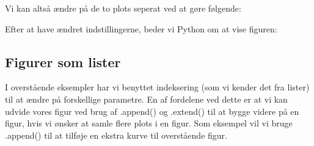 \documentclass[letterpaper,10pt,english]{jupyterBook}
\begin{document}
Vi kan altså ændre på de to plots seperat ved at gøre følgende:

\begin{sphinxVerbatim}[commandchars=\\\{\}]
\PYG{p}{[}\PYG{p}{]}    
\end{sphinxVerbatim}

\begin{sphinxVerbatim}[commandchars=\\\{\}]
\PYG{p}{[}\PYG{p}{]}      
\PYG{p}{[}\PYG{p}{]}       
\end{sphinxVerbatim}

Efter at have ændret indstillingerne, beder vi Python om at vise figuren:

\begin{sphinxVerbatim}[commandchars=\\\{\}]
\end{sphinxVerbatim}

\noindent{}


\subsection{Figurer som lister}
\label{\detokenize{notebooks/sympy/Notebook3_plot:figurer-som-lister}}
I overstående eksempler har vi benyttet indeksering (som vi kender det fra lister) til at ændre på forskellige parametre. En af fordelene ved dette er at vi kan udvide vores figur ved brug af .append() og .extend() til at bygge videre på en figur, hvis vi ønsker at samle flere plots i en figur. Som eksempel vil vi bruge .append() til at tilføje en ekstra kurve til overstående figur.
\end{document}
